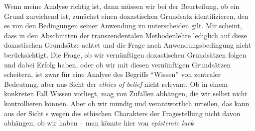 Wenn meine Analyse richtig ist, dann müssen wir bei der Beurteilung, ob ein
Grund zureichend ist, zunächst einen doxastischen Grundsatz identifizieren,
den es von den Bedingungen seiner Anwendung zu unterscheiden gilt. Mir scheint,
dass  in den Abschnitten der transzendentalen Methodenlehre
lediglich auf diese doxastischen Grundsätze achtet und die Frage nach
Anwendungsbedingung nicht berücksichtigt. Die Frage, ob wir vernünftigen
doxastischen Grundsätzen folgen und dabei Erfolg haben,  oder ob wir mit diesen
vernünftigen Grundsätzen scheitern, ist zwar für eine Analyse des Begriffs
\enquote{Wissen} von zentraler Bedeutung, aber aus Sicht der \emph{ethics of
belief} nicht relevant. Ob in einem konkreten Fall Wissen vorliegt, mag von
Zufällen abhängen, die wir selbst nicht kontrollieren können. Aber ob wir mündig
und verantwortlich urteilen, das kann aus der Sicht s
wegen des ethischen Charakters der Fragestellung nicht davon abhängen, ob wir
 haben -- man könnte hier von \emph{epistemic luck}
